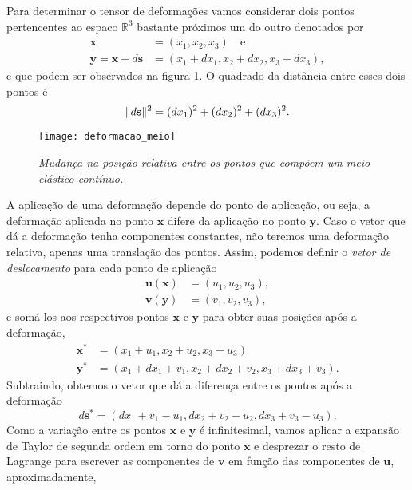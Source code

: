Para determinar o tensor de deforma\c{c}\~oes vamos considerar dois pontos pertencentes ao espaco $\mathbb{R}^3$ bastante pr\'oximos um do outro denotados por
\begin{align*}
\mathbf{x}&=(x_1,x_2,x_3)\quad\text{e}\\
\mathbf{y}=\mathbf{x}+d\mathbf{s}&=(x_1+dx_1,x_2+dx_2,x_3+dx_3),
\end{align*}
e que podem ser observados na figura \ref{fig.deformacao_meio}. O quadrado da dist\^ancia entre esses dois pontos \'e
\begin{equation}\label{eq.dist_antes_defor}
\lVert d\mathbf{s}\rVert^2=(dx_1)^2+(dx_2)^2+(dx_3)^2.
\end{equation}
\begin{figure}
\centering
\texttt{[image: deformacao\_meio]}
\caption{\textit{Mudan\c{c}a na posi\c{c}\~ao relativa entre os pontos que comp\~oem um  meio el\'astico cont\'inuo.}}
\label{fig.deformacao_meio}
\end{figure}
A aplica\c{c}\~ao de uma deforma\c{c}\~ao depende do ponto de aplica\c{c}\~ao, ou seja, a deforma\c{c}\~ao aplicada no ponto $\mathbf{x}$ difere da aplica\c{c}\~ao no ponto $\mathbf{y}$. Caso o vetor que d\'a a deforma\c{c}\~ao tenha componentes constantes, n\~ao teremos uma deforma\c{c}\~ao relativa, apenas uma transla\c{c}\~ao dos pontos. Assim, podemos definir o \textit{vetor de deslocamento} para cada ponto de aplica\c{c}\~ao
\begin{align*}
\mathbf{u}(\mathbf{x})&=(u_1,u_2,u_3),\\
\mathbf{v}(\mathbf{y})&=(v_1,v_2,v_3),
\end{align*}
e som\'a-los aos respectivos pontos $\mathbf{x}$ e $\mathbf{y}$ para obter suas posi\c{c}\~oes ap\'os a deforma\c{c}\~ao,
\begin{align*}
\mathbf{x}^*&=(x_1+u_1,x_2+u_2,x_3+u_3)\\
\mathbf{y}^*&=(x_1+dx_1+v_1,x_2+dx_2+v_2,x_3+dx_3+v_3).
\end{align*}
Subtraindo, obtemos o vetor que d\'a a diferen\c{c}a entre os pontos ap\'os a deforma\c{c}\~ao
\begin{equation}\label{eq.dist_apos_defor}
d\mathbf{s}^*=(dx_1+v_1-u_1,dx_2+v_2-u_2,dx_3+v_3-u_3).
\end{equation}
Como a varia\c{c}\~ao entre os pontos $\mathbf{x}$ e $\mathbf{y}$ \'e infinitesimal, vamos aplicar a expans\~ao de Taylor de segunda ordem em torno do ponto $\mathbf{x}$ e desprezar o resto de Lagrange para escrever as componentes de $\mathbf{v}$ em fun\c{c}\~ao das componentes de $\mathbf{u}$, aproximadamente,
